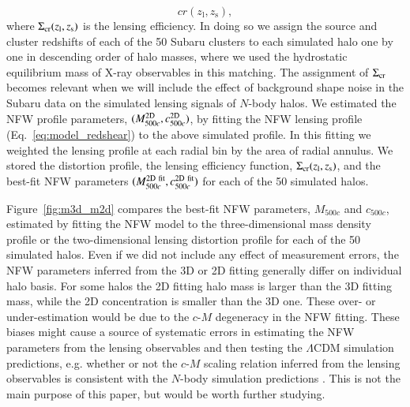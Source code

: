 \documentclass[iop, apj]{emulateapj}
\newcommand{\?}{\stackrel{?}{=}}
\begin{document}
\begin{itemize}
\begin{equation}
{{	 cr}(z_\mathrm{l},z_\mathrm{s})}, 
       \end{equation}
       where $\Sigma_{\rm cr}(z_\mathrm{l},z_\mathrm{s})$ is the lensing
       efficiency.  In doing so we assign the source and cluster
       redshifts of each of the 50 Subaru clusters to each simulated
       halo one by one in descending order of halo masses, where we used
       the hydrostatic equilibrium mass of X-ray observables in this
       matching. The assignment of $\Sigma_{\rm cr}$ becomes relevant
       when we will include the effect of background shape noise in the
       Subaru data on the simulated lensing signals of $N$-body
       halos. We estimated the NFW profile parameters, $(M_{500c}^{\rm
       2D},c_{500c}^{\rm 2D})$, by fitting the NFW lensing profile
       (Eq.~\ref{eq:model_redshear}) to the above simulated profile. In
       this fitting we weighted the lensing profile at each radial bin
       by the area of radial annulus.  We stored the distortion profile,
       the lensing efficiency function, $\Sigma_{\rm
       cr}(z_\mathrm{l},z_\mathrm{s})$, and the best-fit NFW parameters
       $(M_{500c}^{\rm 2D~ fit},c_{500c}^{\rm 2D~ fit})$ for each of the
       50 simulated halos.
\end{itemize}
%


 \begin{figure}
 \end{figure}
Figure~\ref{fig:m3d_m2d} compares the best-fit NFW parameters,
$M_{500c}$ and $c_{500c}$, estimated by fitting the NFW model to the
three-dimensional mass density profile or the two-dimensional lensing
distortion profile for each of the 50 simulated halos.  Even if we did
not include any effect of measurement errors, the NFW parameters
inferred from the 3D or 2D fitting generally differ on individual halo
basis. For some halos the 2D fitting halo mass is larger than the 3D
fitting mass, while the 2D concentration is smaller than the 3D
one. These over- or under-estimation would be due to the $c$-$M$
degeneracy in the NFW fitting. These biases might cause a source of
systematic errors in estimating the NFW parameters from the lensing
observables and then testing the $\Lambda$CDM simulation predictions,
e.g. whether or not the $c$-$M$ scaling relation inferred from the
lensing observables is consistent with the $N$-body simulation
predictions \citep[e.g.,][]{Okabeetal:10,Okabeetal:13,Umetsuetal:14}.
This is not the main purpose of this paper, but would be worth further
studying.
 
\end{document}
